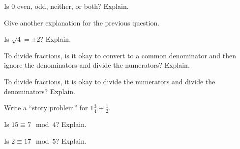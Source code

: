 \documentclass{ximera}
\begin{document}
\begin{question}
Is $0$ even, odd, neither, or both?  Explain.  
\begin{freeResponse}
\end{freeResponse}
\end{question}

\begin{question}
Give another explanation for the previous question.   
\begin{freeResponse}
\end{freeResponse}
\end{question}

\begin{question}
Is $\sqrt{4}=\pm2$?  Explain.  
\begin{freeResponse}
\end{freeResponse}
\end{question}

\begin{question}
To divide fractions, is it okay to convert to a common denominator and then ignore the denominators and divide the numerators?  Explain. 
\begin{freeResponse}
\end{freeResponse}
\end{question}

\begin{question}
To divide fractions, it is okay to divide the numerators and divide the denominators?  Explain.  
\begin{freeResponse}
\end{freeResponse}
\end{question}

\begin{question}
Write a ``story problem'' for $1\frac{3}{4}\div\frac{1}{2}$.  
\begin{freeResponse}
\end{freeResponse}
\end{question}

\begin{question}
Is $15 \equiv 7 \mod 4$?  Explain.  
\begin{freeResponse}
\end{freeResponse}
\end{question}

\begin{question}
Is $2 \equiv 17 \mod 5$?  Explain.  
\begin{freeResponse}
\end{freeResponse}
\end{question}
\end{document}
